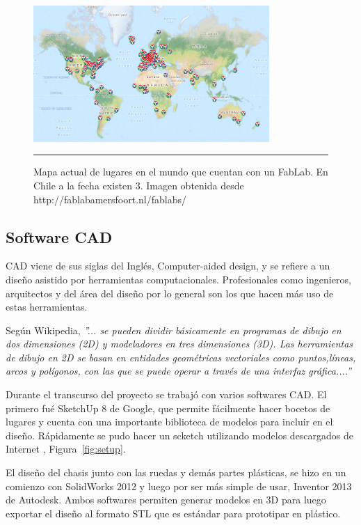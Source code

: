 \begin{figure}[htbp]
	\centering
		\includegraphics[width=0.8\textwidth]{./Figures/map.png}
		\rule{35em}{0.5pt}
	\caption[modirev1]{Mapa actual de lugares en el mundo que cuentan con un FabLab. En Chile a la fecha existen 3. Imagen obtenida desde http://fablabamersfoort.nl/fablabs/}
	\label{fig:Fablabs}
\end{figure}	

\subsection{Software CAD}

CAD viene de sus siglas del Inglés, Computer-aided design, y se refiere a un diseño asistido por herramientas computacionales. Profesionales como ingenieros, arquitectos y del área del diseño por lo general son los que hacen más uso de estas herramientas.

Según Wikipedia, \textit{”... se pueden dividir básicamente en programas de dibujo en dos dimensiones (2D) y modeladores en tres dimensiones (3D). Las herramientas de dibujo en 2D se basan en entidades geométricas vectoriales como puntos,líneas, arcos y polígonos, con las que se puede operar a través de una interfaz gráfica....”}

Durante el transcurso del proyecto se trabajó con varios softwares CAD. El primero fué SketchUp 8 de Google, que permite fácilmente hacer bocetos de lugares y cuenta con una importante biblioteca de modelos para incluir en el diseño. Rápidamente se pudo hacer un scketch utilizando modelos descargados de Internet , Figura~\ref{fig:setup}.

El diseño del chasis junto con las ruedas y demás partes plásticas, se hizo en un comienzo con SolidWorks 2012 y luego por ser más simple de usar, Inventor 2013 de Autodesk. Ambos softwares permiten generar modelos en 3D para luego exportar el diseño al formato STL que es estándar para prototipar en plástico.



